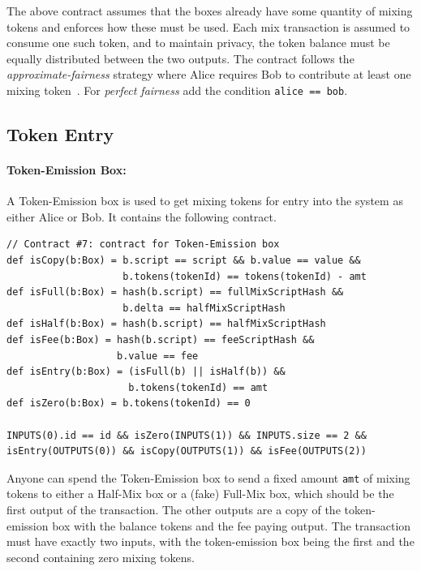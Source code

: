\documentclass[runningheads]{llncs}
\begin{document}
The above contract assumes that the boxes already have some quantity of mixing tokens and enforces how these must be used. Each mix transaction is assumed to consume one such token, and to maintain privacy, the token balance must be equally distributed between the two outputs. The contract follows the {\em approximate-fairness} strategy where Alice requires Bob to contribute at least one mixing token~\cite{advtutorial}. For {\em perfect fairness} add the condition \texttt{alice == bob}. 

\subsection{Token Entry}

\paragraph{Token-Emission Box:} A Token-Emission box is used to get mixing tokens for entry into the system as either Alice or Bob. It contains the following contract. 

{\small
\begin{Verbatim}[frame=single]
// Contract #7: contract for Token-Emission box
def isCopy(b:Box) = b.script == script && b.value == value &&
                    b.tokens(tokenId) == tokens(tokenId) - amt
def isFull(b:Box) = hash(b.script) == fullMixScriptHash && 
                    b.delta == halfMixScriptHash
def isHalf(b:Box) = hash(b.script) == halfMixScriptHash
def isFee(b:Box) = hash(b.script) == feeScriptHash &&
                   b.value == fee
def isEntry(b:Box) = (isFull(b) || isHalf(b)) && 
                     b.tokens(tokenId) == amt
def isZero(b:Box) = b.tokens(tokenId) == 0

INPUTS(0).id == id && isZero(INPUTS(1)) && INPUTS.size == 2 &&
isEntry(OUTPUTS(0)) && isCopy(OUTPUTS(1)) && isFee(OUTPUTS(2))
\end{Verbatim}
}

Anyone can spend the Token-Emission box to send a fixed amount \texttt{amt} of mixing tokens to either a Half-Mix box or a (fake) Full-Mix box, which should be the first output of the transaction. The other outputs are a copy of the token-emission box with the balance tokens and the fee paying output. The transaction must have exactly two inputs, with the token-emission box being the first and the second containing zero mixing tokens. 
\end{document}
